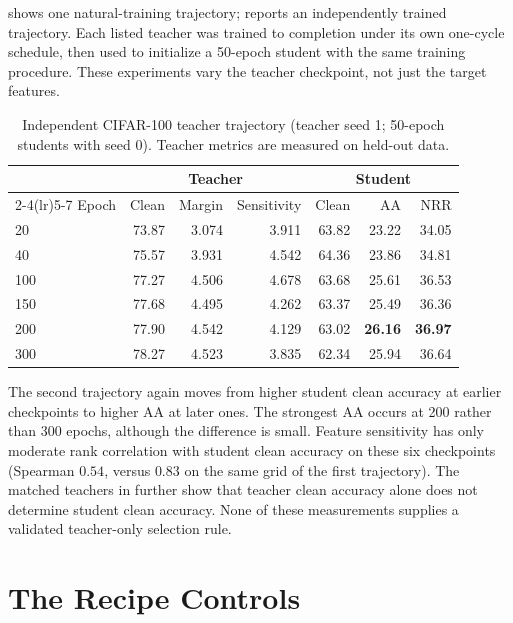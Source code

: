  shows one natural-training trajectory; 
reports an independently trained trajectory. Each listed teacher was trained to completion under
its own one-cycle schedule, then used to initialize a 50-epoch student with the same training
procedure. These experiments vary the teacher checkpoint, not just the target features.

\begin{table}[!htbp]
  \centering \small \setlength{\tabcolsep}{4pt}
  \caption{Independent CIFAR-100 teacher trajectory (teacher seed 1; 50-epoch students with
  seed 0). Teacher metrics are measured on held-out data.}
  \label{tab:teacherladder_seed1}
  \begin{tabular}{lrrrrrr}
    \toprule
    & \multicolumn{3}{c}{Teacher} & \multicolumn{3}{c}{Student} \\
    \cmidrule(lr){2-4}\cmidrule(lr){5-7}
    Epoch & Clean & Margin & Sensitivity & Clean & AA & NRR \\
    \midrule
    20       & 73.87 & 3.074 & 3.911 & 63.82 & 23.22 & 34.05 \\
    40       & 75.57 & 3.931 & 4.542 & 64.36 & 23.86 & 34.81 \\
    100      & 77.27 & 4.506 & 4.678 & 63.68 & 25.61 & 36.53 \\
    150      & 77.68 & 4.495 & 4.262 & 63.37 & 25.49 & 36.36 \\
    200      & 77.90 & 4.542 & 4.129 & 63.02 & \textbf{26.16} & \textbf{36.97} \\
    300      & 78.27 & 4.523 & 3.835 & 62.34 & 25.94 & 36.64 \\
    \bottomrule
  \end{tabular}
\end{table}

The second trajectory again moves from higher student clean accuracy at earlier checkpoints to
higher AA at later ones. The strongest AA occurs at 200 rather than 300 epochs, although the
difference is small. Feature sensitivity has only moderate rank correlation with student clean
accuracy on these six checkpoints (Spearman $0.54$, versus $0.83$ on the same grid of the first
trajectory). The matched teachers in  further show that teacher clean
accuracy alone does not determine student clean accuracy. None of these measurements supplies a
validated teacher-only selection rule.

\section{The Recipe Controls}
\label{app:recipe}

